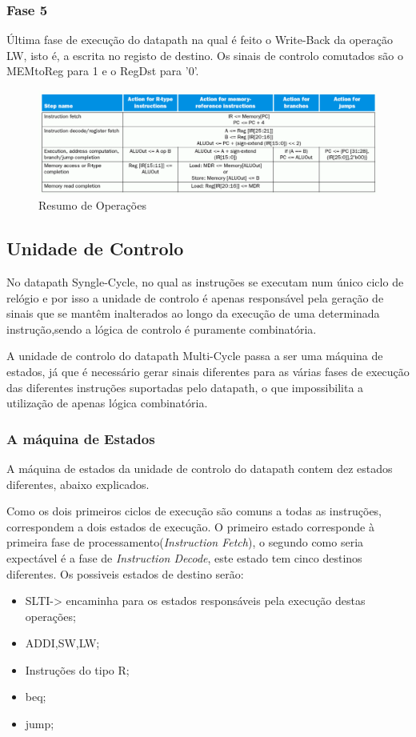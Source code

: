 \documentclass[10pt,a4paper]{book}
\begin{document}
			\subsubsection{Fase 5}

			Última fase de execução do datapath na qual é feito o Write-Back da operação LW, isto é, a escrita no registo de destino.
			Os sinais de controlo comutados são o MEMtoReg para 1 e o RegDst para '0'.


		\begin{figure}[htp]
	    	\centering
	    	\includegraphics[scale=0.3]{mc2.png}
	    	\caption{Resumo de Operações}
	    	\label{Resumo de Operações}
		\end{figure}


		\subsection{Unidade de Controlo}

		No datapath Syngle-Cycle, no qual as instruções se executam num único ciclo de relógio e por isso
		a unidade de controlo é apenas responsável pela  geração de sinais que se mantêm inalterados ao
		longo da execução de uma determinada instrução,sendo a lógica de controlo é puramente combinatória.

		A unidade de controlo do datapath Multi-Cycle passa a ser uma máquina de estados, já que é necessário gerar sinais diferentes
		para as várias fases de execução das diferentes instruções suportadas pelo datapath,
		o que impossibilita a utilização de apenas lógica combinatória.

	  \subsubsection{A máquina de Estados}
		A máquina de estados da unidade de controlo do datapath contem dez estados diferentes, abaixo explicados.



		Como os dois primeiros ciclos de execução são comuns a todas as instruções, correspondem a dois estados de execução.
		O primeiro estado corresponde à primeira fase de processamento(\textit{Instruction Fetch}), o segundo como seria expectável é a fase de \textit{Instruction Decode}, este estado tem cinco destinos diferentes.
		Os possiveis estados de destino serão:
		\begin{itemize}
			\item SLTI-> encaminha para os estados responsáveis pela execução destas operações;
			\item ADDI,SW,LW;
			\item Instruções do tipo R;
			\item beq;
			\item jump;
		\end{itemize}
\end{document}
